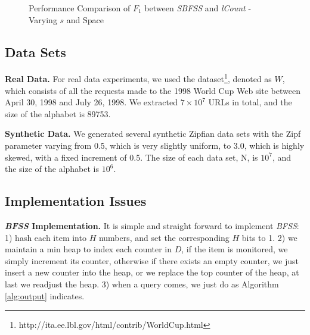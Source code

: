 \documentclass[conference]{IEEEtran}
\begin{document}
\begin{figure}[!t]
\begin{minipage}{0.23\linewidth}
	\end{minipage}
	\begin{minipage}{0.23\linewidth}
		\centering
	\end{minipage}
	\caption{Performance Comparison of $F_1$ between \emph{SBFSS} and \emph{lCount} - Varying $s$ and Space}
	\label{fig:F1}
\end{figure}
\subsection{Data Sets}
\textbf{Real Data.} For real data experiments, we used the dataset\footnote{http://ita.ee.lbl.gov/html/contrib/WorldCup.html}, denoted as $W$, which consists of all the requests made to the 1998 World Cup Web site between April 30, 1998 and July 26, 1998. We extracted $7\times10^7$ URLs in total, and the size of the alphabet is 89753.\par
\textbf{Synthetic Data.} We generated several synthetic Zipfian data sets with the Zipf parameter varying from 0.5, which is very slightly uniform, to 3.0, which is highly skewed, with a fixed increment of 0.5. The size of each data set, N, is $10^7$, and the size of the alphabet is $10^6$.
\subsection{Implementation Issues}
\textbf{\emph{BFSS} Implementation.} It is simple and straight forward to implement \emph{BFSS}: 1) hash each item into $H$ numbers, and set the corresponding $H$ bits to 1. 2) we maintain a min heap to index each counter in $D$, if the item is monitored, we simply increment its counter, otherwise if there exists an empty counter, we just insert a new counter into the heap, or we replace the top counter of the heap, at last we readjust the heap. 3) when a query comes, we just do as Algorithm \ref{alg:output} indicates.\par
\end{document}
